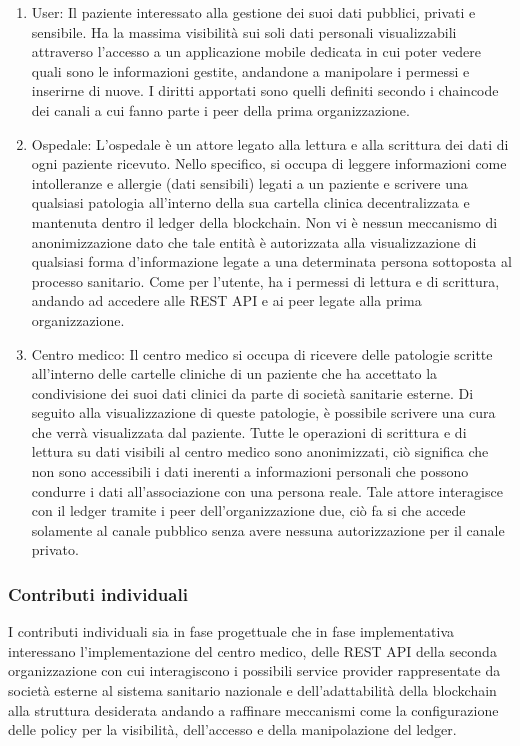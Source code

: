\begin{enumerate}
    \item User: Il paziente interessato alla gestione dei suoi dati pubblici, privati e sensibile. Ha la massima visibilità sui soli dati personali visualizzabili attraverso l'accesso a un applicazione mobile dedicata in cui poter vedere quali sono le informazioni gestite, andandone a manipolare i permessi e inserirne di nuove. I diritti apportati sono quelli definiti secondo i chaincode dei canali a cui fanno parte i peer della prima organizzazione.
    \item Ospedale: L'ospedale è un attore legato alla lettura e alla scrittura dei dati di ogni paziente ricevuto. Nello specifico, si occupa di leggere informazioni come intolleranze e allergie (dati sensibili) legati a un paziente e scrivere una qualsiasi patologia all'interno della sua cartella clinica decentralizzata e mantenuta dentro il ledger della blockchain. Non vi è nessun meccanismo di anonimizzazione dato che tale entità è autorizzata alla visualizzazione di qualsiasi forma d'informazione legate a una determinata persona sottoposta al processo sanitario. Come per l'utente, ha i permessi di lettura e di scrittura, andando ad accedere alle REST API e ai peer legate alla prima organizzazione.
    \item Centro medico: Il centro medico si occupa di ricevere delle patologie scritte all'interno delle cartelle cliniche di un paziente che ha accettato la condivisione dei suoi dati clinici da parte di società sanitarie esterne. Di seguito alla visualizzazione di queste patologie, è possibile scrivere una cura che verrà visualizzata dal paziente. Tutte le operazioni di scrittura e di lettura su dati visibili al centro medico sono anonimizzati, ciò significa che non sono accessibili i dati inerenti a informazioni personali che possono condurre i dati all'associazione con una persona reale. Tale attore interagisce con il ledger tramite i peer dell'organizzazione due, ciò fa si che accede solamente al canale pubblico senza avere nessuna autorizzazione per il canale privato.
\end{enumerate}
\subsubsection{Contributi individuali}
I contributi individuali sia in fase progettuale che in fase implementativa interessano l'implementazione del centro medico, delle REST API della seconda organizzazione con cui interagiscono i possibili service provider rappresentate da società esterne al sistema sanitario nazionale e dell'adattabilità della blockchain alla struttura desiderata andando a raffinare meccanismi come la configurazione delle policy per la visibilità, dell'accesso e della manipolazione del ledger.
